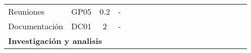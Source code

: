 \begin{table}[h]
\begin{tabular}{|llcllllllllllllllll|}
        \multicolumn{1}{|l|}{Reuniones}                                                                            & \multicolumn{1}{l|}{GP05}                                                      & \multicolumn{1}{c|}{0.2}                                                         & \multicolumn{1}{l|}{-}                                                               &                                 &                                 &                                 &                                 &                                 &                                 &                                 &                                 & \cellcolor[HTML]{EF8787}        &                                 &                                 &                                 &                                 &                                 &                          \\ \cline{1-4}
        \multicolumn{1}{|l|}{Documentación}                                                                        & \multicolumn{1}{l|}{DC01}                                                      & \multicolumn{1}{c|}{2}                                                           & \multicolumn{1}{l|}{-}                                                               & \cellcolor[HTML]{C9C9C9}        & \cellcolor[HTML]{C9C9C9}        & \cellcolor[HTML]{C9C9C9}        & \cellcolor[HTML]{C9C9C9}        & \cellcolor[HTML]{C9C9C9}        &                                 &                                 &                                 & \cellcolor[HTML]{FFFFFF}        & \cellcolor[HTML]{FFFFFF}        & \cellcolor[HTML]{C9C9C9}        & \cellcolor[HTML]{C9C9C9}        & \cellcolor[HTML]{C9C9C9}        & \cellcolor[HTML]{C9C9C9}        & \cellcolor[HTML]{C9C9C9} \\ \hline
        \multicolumn{4}{|l|}{\textbf{Investigación y analisis}}                                                                                                                                                                                                                                                                                                               & \multicolumn{15}{l|}{}                                                                                                                                                                                                                                                                                                                                                                                                                                                                                               \\ \hline

\end{tabular}
\end{table}

